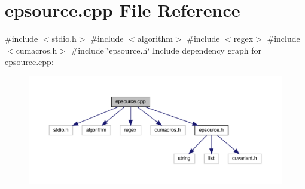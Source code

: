 \section{epsource.\+cpp File Reference}
\label{epsource_8cpp}
{\ttfamily \#include $<$stdio.\+h$>$}\newline
{\ttfamily \#include $<$algorithm$>$}\newline
{\ttfamily \#include $<$regex$>$}\newline
{\ttfamily \#include $<$cumacros.\+h$>$}\newline
{\ttfamily \#include \char`\"{}epsource.\+h\char`\"{}}\newline
Include dependency graph for epsource.\+cpp\+:\nopagebreak
\begin{figure}[H]
\begin{center}
\leavevmode
\includegraphics[width=350pt]{epsource_8cpp__incl}
\end{center}
\end{figure}
